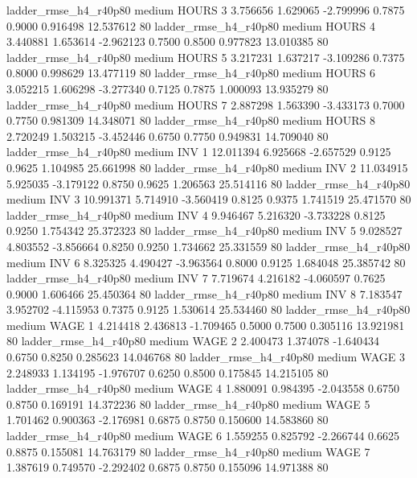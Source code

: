  ladder_rmse_h4_r40p80     medium    HOURS                 3  3.756656 1.629065 -2.799996 0.7875 0.9000  0.916498   12.537612 80
 ladder_rmse_h4_r40p80     medium    HOURS                 4  3.440881 1.653614 -2.962123 0.7500 0.8500  0.977823   13.010385 80
 ladder_rmse_h4_r40p80     medium    HOURS                 5  3.217231 1.637217 -3.109286 0.7375 0.8000  0.998629   13.477119 80
 ladder_rmse_h4_r40p80     medium    HOURS                 6  3.052215 1.606298 -3.277340 0.7125 0.7875  1.000093   13.935279 80
 ladder_rmse_h4_r40p80     medium    HOURS                 7  2.887298 1.563390 -3.433173 0.7000 0.7750  0.981309   14.348071 80
 ladder_rmse_h4_r40p80     medium    HOURS                 8  2.720249 1.503215 -3.452446 0.6750 0.7750  0.949831   14.709040 80
 ladder_rmse_h4_r40p80     medium      INV                 1 12.011394 6.925668 -2.657529 0.9125 0.9625  1.104985   25.661998 80
 ladder_rmse_h4_r40p80     medium      INV                 2 11.034915 5.925035 -3.179122 0.8750 0.9625  1.206563   25.514116 80
 ladder_rmse_h4_r40p80     medium      INV                 3 10.991371 5.714910 -3.560419 0.8125 0.9375  1.741519   25.471570 80
 ladder_rmse_h4_r40p80     medium      INV                 4  9.946467 5.216320 -3.733228 0.8125 0.9250  1.754342   25.372323 80
 ladder_rmse_h4_r40p80     medium      INV                 5  9.028527 4.803552 -3.856664 0.8250 0.9250  1.734662   25.331559 80
 ladder_rmse_h4_r40p80     medium      INV                 6  8.325325 4.490427 -3.963564 0.8000 0.9125  1.684048   25.385742 80
 ladder_rmse_h4_r40p80     medium      INV                 7  7.719674 4.216182 -4.060597 0.7625 0.9000  1.606466   25.450364 80
 ladder_rmse_h4_r40p80     medium      INV                 8  7.183547 3.952702 -4.115953 0.7375 0.9125  1.530614   25.534460 80
 ladder_rmse_h4_r40p80     medium     WAGE                 1  4.214418 2.436813 -1.709465 0.5000 0.7500  0.305116   13.921981 80
 ladder_rmse_h4_r40p80     medium     WAGE                 2  2.400473 1.374078 -1.640434 0.6750 0.8250  0.285623   14.046768 80
 ladder_rmse_h4_r40p80     medium     WAGE                 3  2.248933 1.134195 -1.976707 0.6250 0.8500  0.175845   14.215105 80
 ladder_rmse_h4_r40p80     medium     WAGE                 4  1.880091 0.984395 -2.043558 0.6750 0.8750  0.169191   14.372236 80
 ladder_rmse_h4_r40p80     medium     WAGE                 5  1.701462 0.900363 -2.176981 0.6875 0.8750  0.150600   14.583860 80
 ladder_rmse_h4_r40p80     medium     WAGE                 6  1.559255 0.825792 -2.266744 0.6625 0.8875  0.155081   14.763179 80
 ladder_rmse_h4_r40p80     medium     WAGE                 7  1.387619 0.749570 -2.292402 0.6875 0.8750  0.155096   14.971388 80
